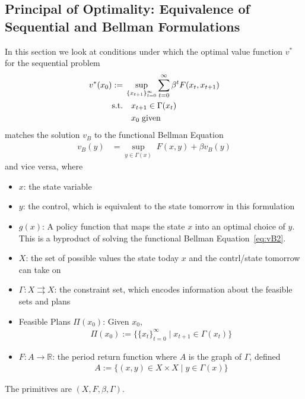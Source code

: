 \documentclass[12pt]{article}
\numberwithin{equation}{section} %
\theoremstyle{plain}
\theoremstyle{definition}
\theoremstyle{remark}
\newcommand{\ra}{\rightarrow}
\newcommand{\R}{\mathbb{R}}
\newcommand{\sumtinfz}{\sum^\infty_{t=0}}
\newcommand{\tinfz}{_{t=0}^\infty}
\begin{document}
\clearpage
\subsection{Principal of Optimality: Equivalence of Sequential and
Bellman Formulations}

In this section we look at conditions under which the optimal value
function $v^*$ for the sequential problem
\begin{align}
  v^*(x_0) :=& \;
  \sup_{\{x_{t+1}\}_{t=0}^\infty}
  \sumtinfz \beta^t F(x_t,x_{t+1})
  \label{eq:vstar}
  \\
  \text{s.t.} & \quad x_{t+1}\in \Gamma(x_t) \notag \\
  & \quad x_{0}\;\text{given}
  \notag
\end{align}
matches the solution $v_B$ to the functional Bellman Equation
\begin{align}
  \label{eq:vB2}
  v_B(y) &=
  \sup_{y\in\Gamma(x)}\;
  F(x,y) +
  \beta v_B(y)
\end{align}
and vice versa, where
\begin{itemize}
  \item $x$: the state variable
  \item $y$: the control, which is equivalent to the state tomorrow in
    this formulation
  \item $g(x)$: A policy function that maps the state $x$ into an
    optimal choice of $y$. This is a byproduct of solving the functional
    Bellman Equation~\ref{eq:vB2}.
  \item $X$: the set of possible values the state today $x$ and the
    contrl/state tomorrow can take on
  \item $\Gamma:X \rightrightarrows X$: the constraint set, which
    encodes information about the feasible sets and plans
  \item Feasible Plans $\Pi(x_0)$:
    Given $x_0$,
    \begin{align*}
      \Pi(x_0) :=
      \big\{ \{x_t\}\tinfz \;|\; x_{t+1} \in \Gamma(x_t) \big\}
    \end{align*}
  \item $F:A\ra \R$: the period return function where $A$ is the
    graph of $\Gamma$, defined
    \begin{align*}
      A:=\{(x,y) \in X\times X \;|\; y \in\Gamma(x)\}
    \end{align*}
\end{itemize}
The primitives are $(X,F,\beta,\Gamma)$.
\end{document}
